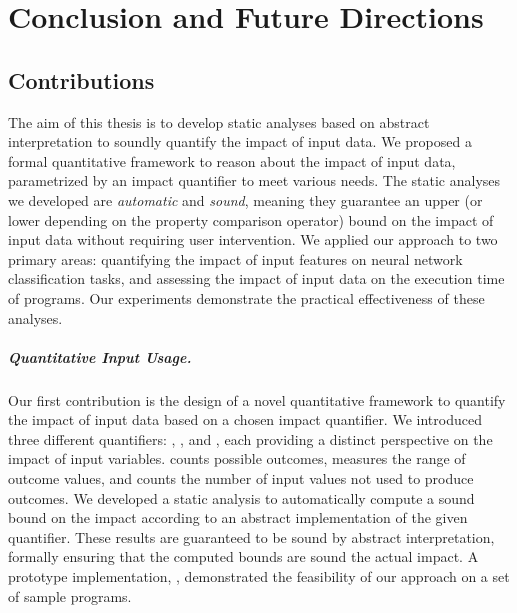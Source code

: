 

\chapter{Conclusion and Future Directions}

\section*{Contributions}


The aim of this thesis is to develop static analyses based on abstract interpretation to soundly quantify the impact of input data.
We proposed a formal quantitative framework to reason about the impact of input data, parametrized by an impact quantifier to meet various needs.
The static analyses we developed are \emph{automatic} and \emph{sound}, meaning they guarantee an upper (or lower depending on the property comparison operator) bound on the impact of input data without requiring user intervention.
We applied our approach to two primary areas: quantifying the impact of input features on neural network classification tasks, and assessing the impact of input data on the execution time of programs.
Our experiments demonstrate the practical effectiveness of these analyses.

\paragraph{Quantitative Input Usage.} Our first contribution is the design of a novel quantitative framework to quantify the impact of input data based on a chosen impact quantifier.
We introduced three different quantifiers: \outcomesname{}, \rangename{}, and \qusedname{}, each providing a distinct perspective on the impact of input variables.
\outcomesname{} counts possible outcomes, \rangename{} measures the range of outcome values, and \qusedname{} counts the number of input values not used to produce outcomes.
We developed a static analysis to automatically compute a sound bound on the impact according to an abstract implementation of the given quantifier.
These results are guaranteed to be sound by abstract interpretation, formally ensuring that the computed bounds are sound \wrt{} the actual impact.
A prototype implementation, \impatto\sidenote{\impattourl}, demonstrated the feasibility of our approach on a set of sample programs.

